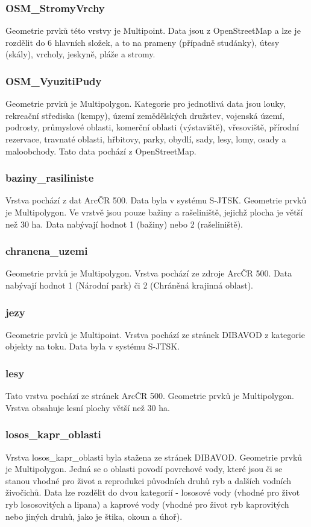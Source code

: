 \documentclass[a4paper, 12pt]{article}
\begin{document}
\subsubsection{OSM\_StromyVrchy}
Geometrie prvků této vrstvy je Multipoint. Data jsou z OpenStreetMap a lze je rozdělit do 6 hlavních složek, a to na prameny (případně studánky), útesy (skály), vrcholy, jeskyně, pláže a stromy.

\subsubsection{OSM\_VyuzitiPudy}
Geometrie prvků je Multipolygon. Kategorie pro jednotlivá data jsou louky, rekreační střediska (kempy), území zemědělských družstev, vojenská území, podrosty, průmyslové oblasti, komerční oblasti (výstaviště), vřesoviště, přírodní rezervace, travnaté oblasti, hřbitovy, parky, obydlí, sady, lesy, lomy, osady a maloobchody. Tato data pochází z OpenStreetMap.


\subsubsection{baziny\_rasiliniste}
Vrstva pochází z dat ArcČR 500. Data byla v systému S-JTSK. Geometrie prvků je Multipolygon. Ve vrstvě jsou pouze bažiny a rašeliniště, jejichž plocha je větší než 30 ha. Data nabývají hodnot 1 (bažiny) nebo 2 (rašeliniště).

\subsubsection{chranena\_uzemi}
Geometrie prvků je Multipolygon. Vrstva pochází ze zdroje ArcČR 500. Data nabývají hodnot 1 (Národní park) či 2 (Chráněná krajinná oblast).

\subsubsection{jezy}
Geometrie prvků je Multipoint. Vrstva pochází ze stránek DIBAVOD z kategorie objekty na toku. Data byla v systému S-JTSK.

\subsubsection{lesy}
Tato vrstva pochází ze stránek ArcČR 500. Geometrie prvků je Multipolygon. Vrstva obsahuje lesní plochy větší než 30 ha. 

\subsubsection{losos\_kapr\_oblasti}
Vrstva losos\_kapr\_oblasti byla stažena ze stránek DIBAVOD. Geometrie prvků je Multipolygon. Jedná se o oblasti povodí povrchové vody, které jsou či se stanou vhodné pro život a reprodukci původních druhů ryb a dalších vodních živočichů. Data lze rozdělit do dvou kategorií - lososové vody (vhodné pro život ryb lososovitých a lipana) a kaprové vody (vhodné pro život ryb kaprovitých nebo jiných druhů, jako je štika, okoun a úhoř). 
\end{document}
